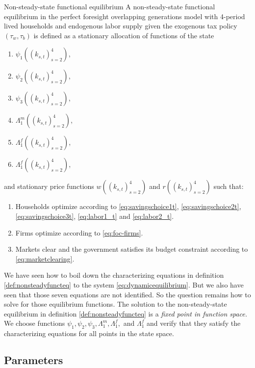 \documentclass[BufferStockTheory]{subfiles}
\begin{document}
 \begin{definition}
 	{Non-steady-state functional equilibrium}
 	\label{def:nonsteadyfuncteq}
 	A non-steady-state functional equilibrium in the perfect foresight overlapping generations model with 4-period lived households and endogenous labor supply given the exogenous tax policy $(\tau_w,\tau_b)$ is defined as a stationary allocation of functions of the state 
 	\begin{enumerate}
 		\item $\psi_1((k_{s,t})_{s=2}^4)$,
 		\item $\psi_2((k_{s,t})_{s=2}^4)$,
 		\item $\psi_3((k_{s,t})_{s=2}^4)$,
 		\item $\Lambda_1^m((k_{s,t})_{s=2}^4)$,
 		\item $\Lambda_1^f((k_{s,t})_{s=2}^4)$,
 		\item $\Lambda_1^f((k_{s,t})_{s=2}^4)$,
 	\end{enumerate}
and stationary price functions $w((k_{s,t})_{s=2}^4)$ and $r((k_{s,t})_{s=2}^4)$ such that:
\begin{enumerate}
	\item Households optimize according to \eqref{eq:savingschoice1t}, \eqref{eq:savingschoice2t},
	 \eqref{eq:savingschoice3t}, \eqref{eq:labor1_t} and \eqref{eq:labor2_t}.
	\item Firms optimize according to \eqref{eq:foc-firms}.
	\item Markets clear and the government satisfies its budget constraint according to \eqref{eq:marketclearing}.
\end{enumerate}
 \end{definition}

 We have seen how to boil down the characterizing equations in definition \ref{def:nonsteadyfuncteq} to the system 
 \eqref{eq:dynamicequilibrium}. But we also have seen that those seven equations are not identified. So the question remains how to solve for those equilibrium functions. The solution to the non-steady-state equilibrium in definition \ref{def:nonsteadyfuncteq} is a \emph{fixed point in function space.} We choose functions $\psi_1,\psi_2,\psi_3,\Lambda_1^m,\Lambda_1^f,$ and $\Lambda_1^f$ and verify that they satisfy the characterizing equations for all points in the state space. 
 

\subsection{Parameters}
\end{document}
